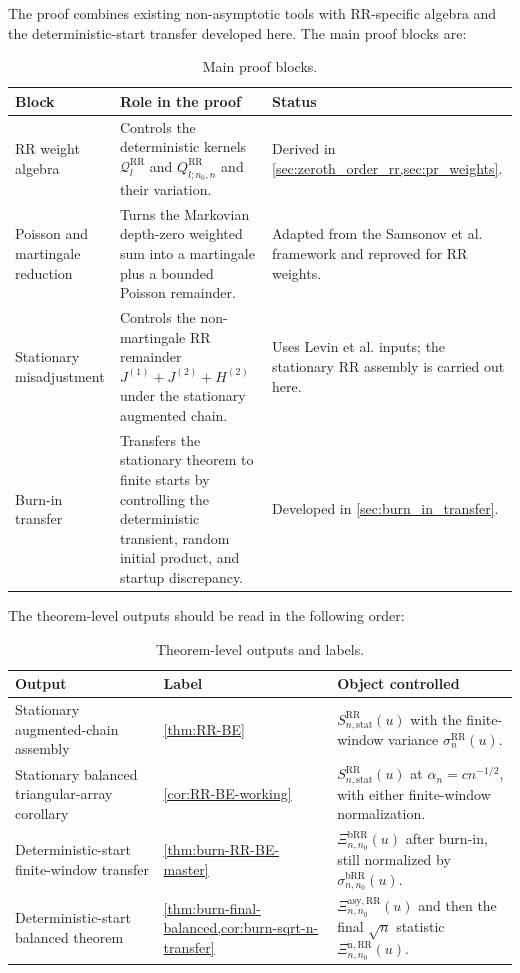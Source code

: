 The proof combines existing non-asymptotic tools with RR-specific algebra and
 the deterministic-start transfer developed here. The main proof blocks are:

\begin{table}[htbp]
\centering
\small
\caption{Main proof blocks.}
\begin{tabular}{|p{}|p{}|p{}|}
\hline
\textbf{Block} & \textbf{Role in the proof} & \textbf{Status} \\
\hline
RR weight algebra &
Controls the deterministic kernels $\mathcal{Q}_{l}^{\mathrm{RR}}$ and
$Q_{l;n_{0},n}^{\mathrm{RR}}$ and their variation. &
Derived in \cref{sec:zeroth_order_rr,sec:pr_weights}. \\
\hline
Poisson and martingale reduction &
Turns the Markovian depth-zero weighted sum into a martingale plus a bounded
Poisson remainder. &
Adapted from the Samsonov et al. framework and reproved for RR weights. \\
\hline
Stationary misadjustment &
Controls the non-martingale RR remainder
$J^{(1)}+J^{(2)}+H^{(2)}$ under the stationary augmented chain. &
Uses Levin et al. inputs; the stationary RR assembly is carried out here. \\
\hline
Burn-in transfer &
Transfers the stationary theorem to finite starts by controlling the
deterministic transient, random initial product, and startup discrepancy. &
Developed in \cref{sec:burn_in_transfer}. \\
\hline
\end{tabular}
\end{table}

The theorem-level outputs should be read in the following order:

\begin{table}[htbp]
\centering
\small
\caption{Theorem-level outputs and labels.}
\begin{tabular}{|p{}|p{}|p{}|}
\hline
\textbf{Output} & \textbf{Label} & \textbf{Object controlled} \\
\hline
Stationary augmented-chain assembly &
\cref{thm:RR-BE} &
$S_{n,\mathrm{stat}}^{\mathrm{RR}}(u)$ with the finite-window variance
$\sigma_{n}^{\mathrm{RR}}(u)$. \\
\hline
Stationary balanced triangular-array corollary &
\cref{cor:RR-BE-working} &
$S_{n,\mathrm{stat}}^{\mathrm{RR}}(u)$ at $\alpha_n=cn^{-1/2}$, with either
finite-window normalization. \\
\hline
Deterministic-start finite-window transfer &
\cref{thm:burn-RR-BE-master} &
$\Xi_{n,n_{0}}^{\mathrm{bRR}}(u)$ after burn-in, still normalized by
$\sigma_{n,n_{0}}^{\mathrm{bRR}}(u)$. \\
\hline
Deterministic-start balanced theorem &
\cref{thm:burn-final-balanced,cor:burn-sqrt-n-transfer} &
$\Xi_{n,n_{0}}^{\mathrm{asy,RR}}(u)$ and then the final $\sqrt n$ statistic
$\Xi_{n,n_{0}}^{\mathrm{n,RR}}(u)$. \\
\hline
\end{tabular}
\end{table}

